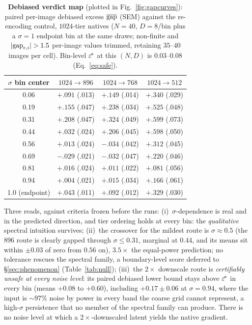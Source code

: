 \begin{table}[t]
\caption{\textbf{Debiased verdict map} (plotted in
Fig.~\ref{fig:gapcurves}): paired per-image debiased excess
$\overline{\mathrm{gap}}$ (SEM) against the re-encoding control, $1024$-tier natives
($N{=}40$, $D{=}8$/bin plus a $\sigma{=}1$ endpoint bin at the same
draws; non-finite and $|\mathrm{gap}_{e,i}| > 1.5$ per-image values trimmed,
retaining $35$--$40$ images per cell). Bin-level $\varepsilon^{\!*}$ at this
$(N, D)$ is $0.03$--$0.08$ (Eq.~\ref{eq:safe}).}
\label{tab:debiasedmap}
\centering
\small
\begin{tabular}{cccc}
\toprule
$\sigma$ bin center & $1024{\to}896$ & $1024{\to}768$ & $1024{\to}512$ \\
\midrule
0.06 & $+.091$ {\scriptsize(.013)} & $+.149$ {\scriptsize(.014)} & $+.340$ {\scriptsize(.029)} \\
0.19 & $+.155$ {\scriptsize(.047)} & $+.238$ {\scriptsize(.034)} & $+.525$ {\scriptsize(.048)} \\
0.31 & $+.208$ {\scriptsize(.047)} & $+.324$ {\scriptsize(.049)} & $+.599$ {\scriptsize(.073)} \\
0.44 & $+.032$ {\scriptsize(.024)} & $+.206$ {\scriptsize(.045)} & $+.598$ {\scriptsize(.050)} \\
0.56 & $+.013$ {\scriptsize(.024)} & $-.034$ {\scriptsize(.042)} & $+.312$ {\scriptsize(.045)} \\
0.69 & $-.029$ {\scriptsize(.021)} & $-.032$ {\scriptsize(.047)} & $+.220$ {\scriptsize(.046)} \\
0.81 & $+.016$ {\scriptsize(.024)} & $+.011$ {\scriptsize(.022)} & $+.081$ {\scriptsize(.056)} \\
0.94 & $+.004$ {\scriptsize(.021)} & $+.015$ {\scriptsize(.034)} & $+.166$ {\scriptsize(.061)} \\
\midrule
1.0 (endpoint) & $+.043$ {\scriptsize(.011)} & $+.092$ {\scriptsize(.012)} & $+.329$ {\scriptsize(.030)} \\
\bottomrule
\end{tabular}
\end{table}

Three reads, against criteria frozen before the runs:
(i)~$\sigma$-dependence is real and in the predicted direction, and tier
ordering holds at every bin: the \emph{qualitative} spectral
intuition survives;
(ii)~the crossover for the mildest route is $\sigma \approx 0.5$
(the $896$ route is clearly gapped through $\sigma \le 0.31$, marginal
at $0.44$, and its means sit within $\pm 0.03$ of zero from $0.56$ on),
$3.5\times$ the equal-power prediction; no tolerance rescues the
spectral family, a boundary-level score deferred to
\S\ref{sec:phenomenon} (Table~\ref{tab:null});
(iii)~the $2\times$ downscale route is \emph{certifiably unsafe at every
noise level}: its paired debiased lower bound stays above $\varepsilon^{\!*}$ in
every bin (means $+0.08$ to $+0.60$), including $+0.17 \pm 0.06$ at
$\sigma = 0.94$, where the input is ${\sim}97\%$ noise by power in every
band the coarse grid cannot represent, a high-$\sigma$ persistence
that no member of the spectral family can produce. There is no noise level at which a
$2\times$-downscaled latent yields the native gradient.

